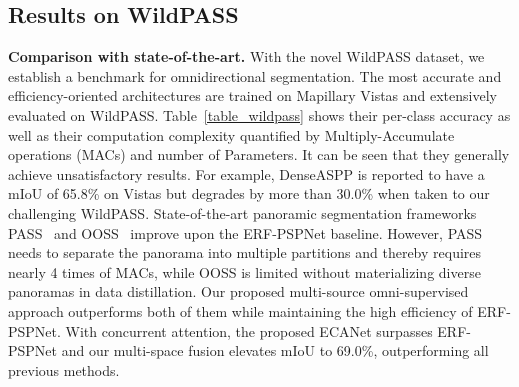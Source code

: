 \documentclass[final]{cvpr}
\begin{document}
\subsection{Results on WildPASS}
\label{sec:results_wildpass}
\noindent
\textbf{Comparison with state-of-the-art.}
With the novel WildPASS dataset, we establish a benchmark for omnidirectional segmentation.
The most accurate and efficiency-oriented architectures are trained on Mapillary Vistas and extensively evaluated on WildPASS.
Table~\ref{table_wildpass} shows their per-class accuracy as well as their computation complexity quantified by Multiply-Accumulate operations (MACs) and number of Parameters.
It can be seen that they generally achieve unsatisfactory results.
For example, DenseASPP is reported to have a mIoU of 65.8\% on Vistas but degrades by more than 30.0\% when taken to our challenging WildPASS.
State-of-the-art panoramic segmentation frameworks PASS~\cite{yang2020pass} and OOSS~\cite{yang2020omnisupervised} improve upon the ERF-PSPNet baseline.
However, PASS needs to separate the panorama into multiple partitions and thereby requires nearly 4 times of MACs, while OOSS is limited without materializing diverse panoramas in data distillation.
Our proposed multi-source omni-supervised approach outperforms both of them while maintaining the high efficiency of ERF-PSPNet.
With concurrent attention, the proposed ECANet surpasses ERF-PSPNet and our multi-space fusion elevates mIoU to 69.0\%, outperforming all previous methods.
\end{document}
